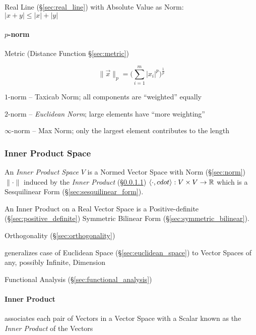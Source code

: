 Real Line (\S\ref{sec:real_line}) with Absolute Value as Norm:\\
$|x + y| \leq |x| + |y|$



\paragraph{$p$-norm}\label{sec:}\hfill

\fist Metric (Distance Function \S\ref{sec:metric})

\[
  \|\vec{x}\|_p = \Big(\sum_{i=1}^m|x_i|^p\Big)^{\frac{1}{p}}
\]

$1$-norm -- Taxicab Norm; all components are ``weighted'' equally

$2$-norm -- \emph{Euclidean Norm}; large elements have ``more weighting''

$\infty$-norm -- Max Norm; only the largest element contributes to the length



\subsubsection{Inner Product Space}\label{sec:innerproduct_space}

An \emph{Inner Product Space} $V$ is a Normed Vector Space with Norm
(\S\ref{sec:norm}) $\|\cdot\|$ induced by the \emph{Inner Product}
(\S\ref{sec:inner_product}) $\langle{\cdot,cdot}\rangle : V \times V
\rightarrow \mathbb{R}$ which is a Sesquilinear Form
(\S\ref{sec:sesquilinear_form}).

An Inner Product on a Real Vector Space is a Positive-definite
(\S\ref{sec:positive_definite}) Symmetric Bilinear Form
(\S\ref{sec:symmetric_bilinear}).

\fist Orthogonality (\S\ref{sec:orthogonality})

generalizes case of Euclidean Space (\S\ref{sec:euclidean_space}) to
Vector Spaces of any, possibly Infinite, Dimension

Functional Analysis (\S\ref{sec:functional_analysis})



\paragraph{Inner Product}\label{sec:inner_product}\hfill

associates each pair of Vectors in a Vector Space with a Scalar known
as the \emph{Inner Product} of the Vectors

